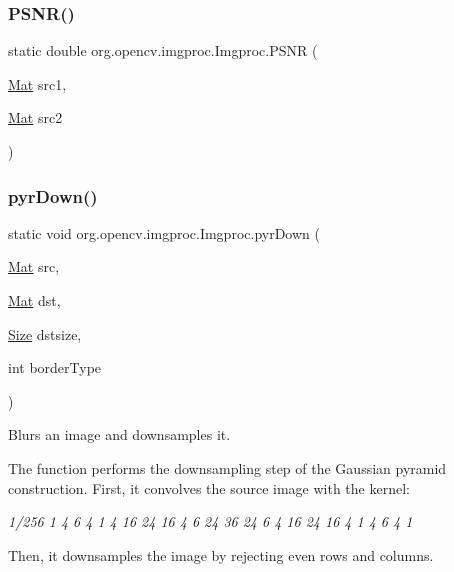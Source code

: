 \subsubsection{\texorpdfstring{P\+S\+N\+R()}{PSNR()}}
{\footnotesize\ttfamily static double org.\+opencv.\+imgproc.\+Imgproc.\+P\+S\+NR (\begin{DoxyParamCaption}\item[{\mbox{\hyperlink{classorg_1_1opencv_1_1core_1_1_mat}{Mat}}}]{src1,  }\item[{\mbox{\hyperlink{classorg_1_1opencv_1_1core_1_1_mat}{Mat}}}]{src2 }\end{DoxyParamCaption})\hspace{0.3cm}{\ttfamily [static]}}

\mbox{\label{classorg_1_1opencv_1_1imgproc_1_1_imgproc_a9ecbfdf7bf014c1215841957f7e7b2ca}} 
\subsubsection{\texorpdfstring{pyr\+Down()}{pyrDown()}\hspace{0.1cm}{\footnotesize\ttfamily [1/3]}}
{\footnotesize\ttfamily static void org.\+opencv.\+imgproc.\+Imgproc.\+pyr\+Down (\begin{DoxyParamCaption}\item[{\mbox{\hyperlink{classorg_1_1opencv_1_1core_1_1_mat}{Mat}}}]{src,  }\item[{\mbox{\hyperlink{classorg_1_1opencv_1_1core_1_1_mat}{Mat}}}]{dst,  }\item[{\mbox{\hyperlink{classorg_1_1opencv_1_1core_1_1_size}{Size}}}]{dstsize,  }\item[{int}]{border\+Type }\end{DoxyParamCaption})\hspace{0.3cm}{\ttfamily [static]}}

Blurs an image and downsamples it.

The function performs the downsampling step of the Gaussian pyramid construction. First, it convolves the source image with the kernel\+:

{\itshape 1/256 1 4 6 4 1 4 16 24 16 4 6 24 36 24 6 4 16 24 16 4 1 4 6 4 1 }

Then, it downsamples the image by rejecting even rows and columns.


